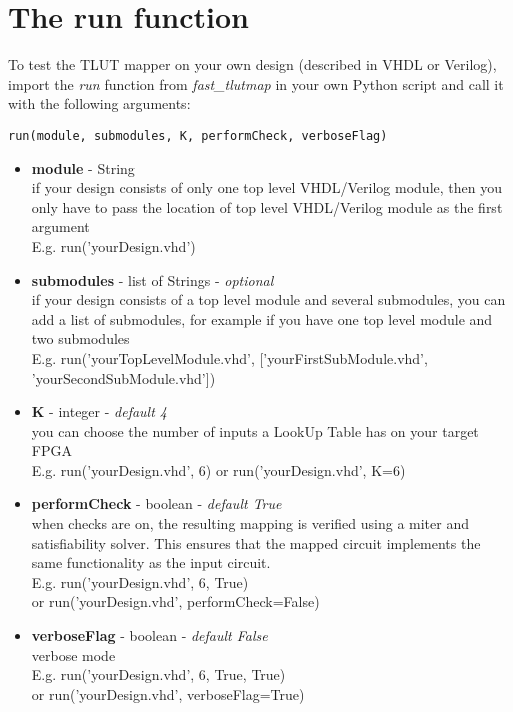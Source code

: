 \documentclass[a4paper]{memoir}
\begin{document}
\section{The run function}\label{sec:run_function}
To test the TLUT mapper on your own design (described in VHDL or Verilog), import the \emph{run} function from \emph{fast\_tlutmap} in your own Python script and call it with the following arguments:
\begin{lstlisting}
run(module, submodules, K, performCheck, verboseFlag)
\end{lstlisting}
\begin{itemize}
\item \textbf{module} - String\\
if your design consists of only one top level VHDL/Verilog module, then you only have to pass the location of top level VHDL/Verilog module as the first argument\\
E.g. run('yourDesign.vhd')
\item \textbf{submodules} - list of Strings - \textit{optional}\\
if your design consists of a top level module and several submodules, you can add a list of submodules,
for example if you have one top level module and two submodules\\
E.g. run('yourTopLevelModule.vhd', ['yourFirstSubModule.vhd', 'yourSecondSubModule.vhd'])
\item \textbf{K} - integer - \textit{default 4}\\
you can choose the number of inputs a LookUp Table has on your target FPGA\\
E.g. run('yourDesign.vhd', 6)
or run('yourDesign.vhd', K=6)
\item \textbf{performCheck} - boolean - \textit{default True}\\
when checks are on, the resulting mapping is verified using a miter and satisfiability solver. This ensures that the mapped circuit implements the same functionality as the input circuit.\\
E.g. run('yourDesign.vhd', 6, True)\\
or run('yourDesign.vhd', performCheck=False)
\item \textbf{verboseFlag} - boolean - \textit{default False}\\
verbose mode\\
E.g. run('yourDesign.vhd', 6, True, True)\\ or run('yourDesign.vhd', verboseFlag=True)
\end{itemize}
\end{document}
